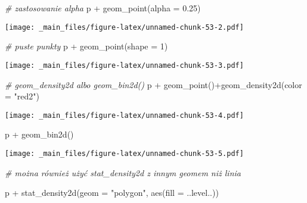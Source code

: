 \documentclass[
]{book}
\newenvironment{Shaded}{\begin{snugshade}}{\end{snugshade}}
\newcommand{\AttributeTok}[1]{\textcolor[rgb]{0.77,0.63,0.00}{#1}}
\newcommand{\CommentTok}[1]{\textcolor[rgb]{0.56,0.35,0.01}{\textit{#1}}}
\newcommand{\DecValTok}[1]{\textcolor[rgb]{0.00,0.00,0.81}{#1}}
\newcommand{\FloatTok}[1]{\textcolor[rgb]{0.00,0.00,0.81}{#1}}
\newcommand{\FunctionTok}[1]{\textcolor[rgb]{0.00,0.00,0.00}{#1}}
\newcommand{\NormalTok}[1]{#1}
\newcommand{\SpecialCharTok}[1]{\textcolor[rgb]{0.00,0.00,0.00}{#1}}
\newcommand{\StringTok}[1]{\textcolor[rgb]{0.31,0.60,0.02}{#1}}
\begin{document}
\begin{Shaded}
\begin{Highlighting}[]
\CommentTok{\# zastosowanie alpha}
\NormalTok{p }\SpecialCharTok{+} \FunctionTok{geom\_point}\NormalTok{(}\AttributeTok{alpha =} \FloatTok{0.25}\NormalTok{)}
\end{Highlighting}
\end{Shaded}

\texttt{[image: \_main\_files/figure-latex/unnamed-chunk-53-2.pdf]}

\begin{Shaded}
\begin{Highlighting}[]
\CommentTok{\# puste punkty}
\NormalTok{p }\SpecialCharTok{+} \FunctionTok{geom\_point}\NormalTok{(}\AttributeTok{shape =} \DecValTok{1}\NormalTok{)}
\end{Highlighting}
\end{Shaded}

\texttt{[image: \_main\_files/figure-latex/unnamed-chunk-53-3.pdf]}

\begin{Shaded}
\begin{Highlighting}[]
\CommentTok{\# geom\_density2d albo geom\_bin2d()}
\NormalTok{p }\SpecialCharTok{+} \FunctionTok{geom\_point}\NormalTok{()}\SpecialCharTok{+}\FunctionTok{geom\_density2d}\NormalTok{(}\AttributeTok{color =} \StringTok{"red2"}\NormalTok{)}
\end{Highlighting}
\end{Shaded}

\texttt{[image: \_main\_files/figure-latex/unnamed-chunk-53-4.pdf]}

\begin{Shaded}
\begin{Highlighting}[]
\NormalTok{p }\SpecialCharTok{+} \FunctionTok{geom\_bin2d}\NormalTok{()}
\end{Highlighting}
\end{Shaded}

\texttt{[image: \_main\_files/figure-latex/unnamed-chunk-53-5.pdf]}

\begin{Shaded}
\begin{Highlighting}[]
\CommentTok{\# można również użyć stat\_density2d z innym geomem niż linia}

\NormalTok{p }\SpecialCharTok{+} \FunctionTok{stat\_density2d}\NormalTok{(}\AttributeTok{geom =} \StringTok{"polygon"}\NormalTok{, }\FunctionTok{aes}\NormalTok{(}\AttributeTok{fill  =}\NormalTok{  ..level..))}
\end{Highlighting}
\end{Shaded}
\end{document}
